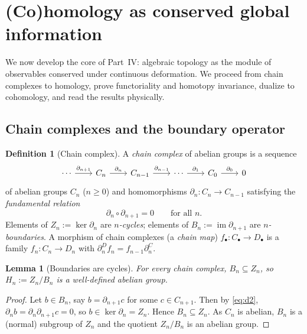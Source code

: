 \documentclass[12pt]{article}
\newtheorem{lemma}[lemma]{Lemma}
\theoremstyle{definition}
\newtheorem{definition}[definition]{Definition}
\theoremstyle{remark}
\newcommand{\im}{\operatorname{im}}
\begin{document}
\section{(Co)homology as conserved global information}
\label{sec:homology}

We now develop the core of Part~IV: algebraic topology as the module of
observables conserved under continuous deformation. We proceed from chain
complexes to homology, prove functoriality and homotopy invariance, dualize to
cohomology, and read the results physically.

\subsection{Chain complexes and the boundary operator}

\begin{definition}[Chain complex]
\label{def:chain}
A \emph{chain complex} of abelian groups is a sequence
\[
\begin{tikzcd}[column sep=2.1em]
\cdots \arrow[r, "\partial_{n+1}"] & C_n \arrow[r, "\partial_n"] & C_{n-1}
  \arrow[r, "\partial_{n-1}"] & \cdots \arrow[r, "\partial_1"] & C_0 \arrow[r, "\partial_0"] & 0
\end{tikzcd}
\]
of abelian groups $C_n$ ($n\ge 0$) and homomorphisms $\partial_n\colon C_n\to
C_{n-1}$ satisfying the \emph{fundamental relation}
\begin{equation}
\label{eq:d2}
  \partial_{n}\circ\partial_{n+1}=0\qquad\text{for all }n .
\end{equation}
Elements of $Z_n:=\ker\partial_n$ are \emph{$n$-cycles}; elements of
$B_n:=\im\partial_{n+1}$ are \emph{$n$-boundaries}. A morphism of chain complexes
(a \emph{chain map}) $f_\bullet\colon C_\bullet\to D_\bullet$ is a family
$f_n\colon C_n\to D_n$ with $\partial^D_n f_n = f_{n-1}\partial^C_n$.
\end{definition}

\begin{lemma}[Boundaries are cycles]
\label{lem:BsubZ}
For every chain complex, $B_n\subseteq Z_n$, so $H_n:=Z_n/B_n$ is a well-defined
abelian group.
\end{lemma}

\begin{proof}
Let $b\in B_n$, say $b=\partial_{n+1}c$ for some $c\in C_{n+1}$. Then by
\eqref{eq:d2},
$\partial_n b = \partial_n\partial_{n+1}c = 0$, so $b\in\ker\partial_n=Z_n$.
Hence $B_n\subseteq Z_n$. As $C_n$ is abelian, $B_n$ is a (normal) subgroup of
$Z_n$ and the quotient $Z_n/B_n$ is an abelian group.
\end{proof}
\end{document}

